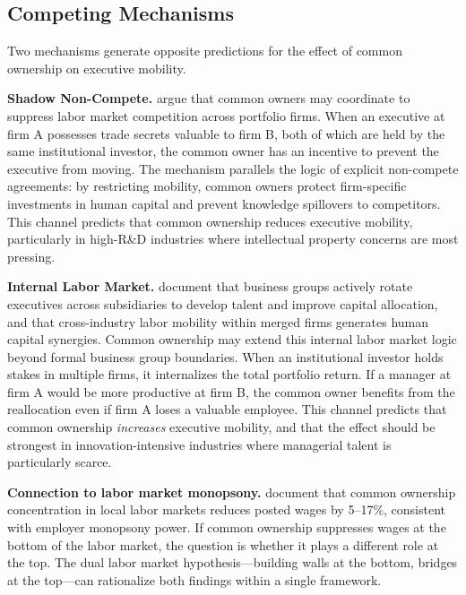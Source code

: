 \documentclass[11pt,a4paper]{article}
\begin{document}
\subsection{Competing Mechanisms}

Two mechanisms generate opposite predictions for the effect of common ownership on executive mobility.

\textbf{Shadow Non-Compete.} \cite{anton2018} argue that common owners may coordinate to suppress labor market competition across portfolio firms. When an executive at firm A possesses trade secrets valuable to firm B, both of which are held by the same institutional investor, the common owner has an incentive to prevent the executive from moving. The mechanism parallels the logic of explicit non-compete agreements: by restricting mobility, common owners protect firm-specific investments in human capital and prevent knowledge spillovers to competitors. This channel predicts that common ownership reduces executive mobility, particularly in high-R\&D industries where intellectual property concerns are most pressing.

\textbf{Internal Labor Market.} \cite{tate2015,tate2024} document that business groups actively rotate executives across subsidiaries to develop talent and improve capital allocation, and that cross-industry labor mobility within merged firms generates human capital synergies. Common ownership may extend this internal labor market logic beyond formal business group boundaries. When an institutional investor holds stakes in multiple firms, it internalizes the total portfolio return. If a manager at firm A would be more productive at firm B, the common owner benefits from the reallocation even if firm A loses a valuable employee. This channel predicts that common ownership \textit{increases} executive mobility, and that the effect should be strongest in innovation-intensive industries where managerial talent is particularly scarce.

\textbf{Connection to labor market monopsony.} \cite{azar2022} document that common ownership concentration in local labor markets reduces posted wages by 5--17\%, consistent with employer monopsony power. If common ownership suppresses wages at the bottom of the labor market, the question is whether it plays a different role at the top. The dual labor market hypothesis---building walls at the bottom, bridges at the top---can rationalize both findings within a single framework.

\newpage
\end{document}
